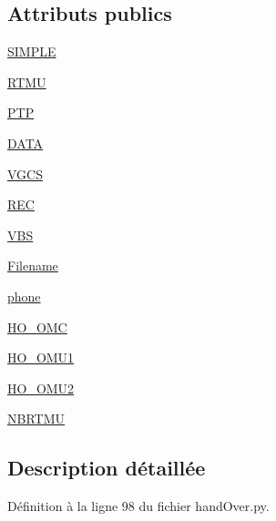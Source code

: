 \subsection*{Attributs publics}
\begin{DoxyCompactItemize}
\item 
\hyperlink{classScript_1_1handOver_1_1MobileTransmitter_a1f16581fb004249e79e9e62f081cb587}{S\+I\+M\+P\+LE}
\item 
\hyperlink{classScript_1_1handOver_1_1MobileTransmitter_a0a95c17a136be45d49aa83638edf2f0d}{R\+T\+MU}
\item 
\hyperlink{classScript_1_1handOver_1_1MobileTransmitter_a7fd1ea34ee9d8b66a96bb04fb56f1ed5}{P\+TP}
\item 
\hyperlink{classScript_1_1handOver_1_1MobileTransmitter_a078bbe0f45ce46f41e06f0faeb37cc1a}{D\+A\+TA}
\item 
\hyperlink{classScript_1_1handOver_1_1MobileTransmitter_accf8be809b557d3dda8ccdc9692f155e}{V\+G\+CS}
\item 
\hyperlink{classScript_1_1handOver_1_1MobileTransmitter_a16368e4843a51b1d473cf75c9ee71ff8}{R\+EC}
\item 
\hyperlink{classScript_1_1handOver_1_1MobileTransmitter_a38f03c3ffddd0e6b91ae0db987d4e79f}{V\+BS}
\item 
\hyperlink{classScript_1_1handOver_1_1MobileTransmitter_a5e7d14e9cab67b5af15e96b6451c8b35}{Filename}
\item 
\hyperlink{classScript_1_1handOver_1_1MobileTransmitter_a866608c9e27a57c84cea03fc1de1696f}{phone}
\item 
\hyperlink{classScript_1_1handOver_1_1MobileTransmitter_a364ca0783d420d2b1913646377ba0123}{H\+O\+\_\+\+O\+MC}
\item 
\hyperlink{classScript_1_1handOver_1_1MobileTransmitter_ae5933fac2e95221c47244fafcf33ff88}{H\+O\+\_\+\+O\+M\+U1}
\item 
\hyperlink{classScript_1_1handOver_1_1MobileTransmitter_aab1fb4256449d1379f82f6e7e741f8c0}{H\+O\+\_\+\+O\+M\+U2}
\item 
\hyperlink{classScript_1_1handOver_1_1MobileTransmitter_a3af626813f1fb97a4dfbd264f032fcc8}{N\+B\+R\+T\+MU}
\end{DoxyCompactItemize}


\subsection{Description détaillée}


Définition à la ligne 98 du fichier hand\+Over.\+py.



